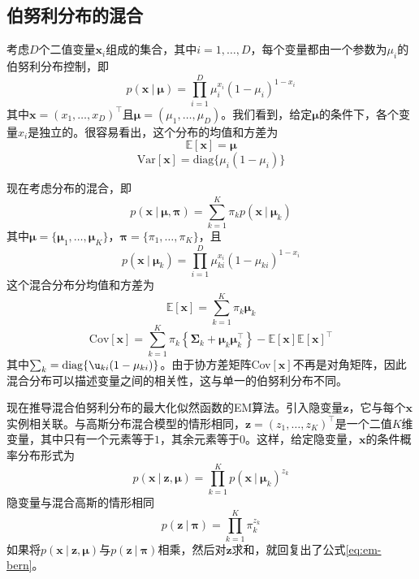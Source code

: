 \documentclass[11pt]{ctexbook}
\begin{document}
\subsection{伯努利分布的混合}
考虑$D$个二值变量$\bm x_i$组成的集合，其中$i=1,\ldots, D$，每个变量都由一个参数为$\mu_i$的伯努利分布控制，即
\begin{equation}
	p(\bm x\ |\ \bm \mu) = \prod_{i=1}^D\mu_i^{x_i}(1-\mu_i)^{1-x_i}
\end{equation}
其中$\bm x = (x_1,\ldots,x_D)^\top$且$\bm \mu=(\mu_1, \ldots, \mu_D)$。我们看到，给定$\bm \mu$的条件下，各个变量$x_i$是独立的。很容易看出，这个分布的均值和方差为
\begin{equation}
	\mathbb E[\bm x] = \bm\mu
\end{equation}
\begin{equation}
	\mathrm{Var}[\bm x] = \mathrm{diag}\{ \mu_i(1-\mu_i) \}
\end{equation}

现在考虑分布的混合，即
\begin{equation}
	\label{eq:em-bern}
	p(\bm x\ |\ \bm\mu, \bm\pi) = \sum_{k=1}^K\pi_kp(\bm x\ |\ \bm\mu_k)
\end{equation}
其中$\bm\mu=\{\bm\mu_1,\ldots,\bm\mu_K\}$，$\bm\pi=\{\pi_1,\ldots,\pi_K\}$，且
\begin{equation}
	p(\bm x\ |\ \bm\mu_k) = \prod_{i=1}^D\mu_{ki}^{x_i}(1-\mu_{ki})^{1-x_i}
\end{equation}
这个混合分布分均值和方差为
\begin{equation}
	\mathbb E[\bm x] = \sum_{k=1}^{K}\pi_k\bm\mu_k
\end{equation}
\begin{equation}
	\mathrm{Cov}[\bm x] = \sum_{k=1}^K\pi_k\left\{ \bm\Sigma_k+\bm\mu_k\bm\mu_k^\top \right\} - \mathbb E[\bm x]\mathbb E[\bm x]^\top
\end{equation}
其中$\sum_k=\mathrm{diag}\{\u_{ki}(1-\mu_{ki})\}$。由于协方差矩阵Cov$[\bm x]$不再是对角矩阵，因此混合分布可以描述变量之间的相关性，这与单一的伯努利分布不同。

现在推导混合伯努利分布的最大化似然函数的EM算法。引入隐变量$\bm z$，它与每个$\bm x$实例相关联。与高斯分布混合模型的情形相同，$\bm z = (z_1, \ldots, z_K)^\top$是一个二值$K$维变量，其中只有一个元素等于$1$，其余元素等于$0$。这样，给定隐变量，$\bm x$的条件概率分布形式为
\begin{equation}
	p(\bm x\ |\ \bm z, \bm\mu) = \prod_{k=1}^K p(\bm x\ |\ \bm\mu_k)^{z_k}
\end{equation}
隐变量与混合高斯的情形相同
\begin{equation}
	p(\bm z\ |\ \bm\pi) = \prod_{k=1}^K \pi_k^{z_k}
\end{equation}
如果将$p(\bm x\ |\ \bm z, \bm\mu)$与$p(\bm z\ |\ \bm\pi)$相乘，然后对$\bm z$求和，就回复出了公式\ref{eq:em-bern}。
\end{document}
